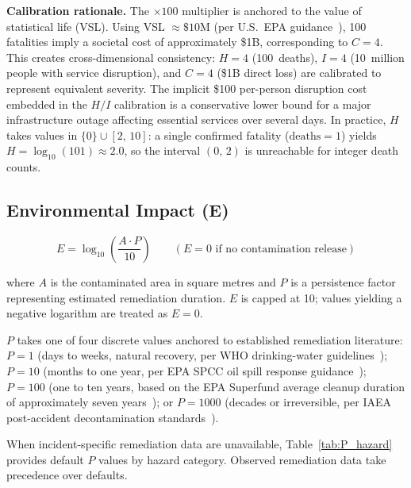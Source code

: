 \documentclass[11pt]{article}
\begin{document}
\textbf{Calibration rationale.}
The $\times 100$ multiplier is anchored to the value of statistical life (VSL).
Using VSL $\approx \$10$M (per U.S.\ EPA guidance~\cite{epa_vsl}),
100 fatalities imply a societal cost of approximately \$1B,
corresponding to $C = 4$.
This creates cross-dimensional consistency:
$H = 4$ (100~deaths), $I = 4$ (10~million people with service disruption),
and $C = 4$ (\$1B direct loss) are calibrated to represent equivalent severity.
The implicit \$100 per-person disruption cost embedded in the $H/I$ calibration
is a conservative lower bound for a major infrastructure outage
affecting essential services over several days.
In practice, $H$ takes values in $\{0\} \cup [2,\, 10]$:
a single confirmed fatality ($\text{deaths} = 1$) yields
$H = \log_{10}(101) \approx 2.0$, so the interval $(0,\, 2)$ is unreachable
for integer death counts.

\subsection{Environmental Impact (E)}

\begin{equation}
  E = \log_{10}\!\left(\frac{A \cdot P}{10}\right)
  \qquad (E = 0 \text{ if no contamination release})
  \label{eq:E}
\end{equation}

where $A$ is the contaminated area in square metres and $P$ is a persistence
factor representing estimated remediation duration.
$E$ is capped at 10; values yielding a negative logarithm are treated as $E = 0$.

$P$ takes one of four discrete values anchored to established remediation
literature: $P = 1$ (days to weeks, natural recovery, per WHO
drinking-water guidelines~\cite{who_water}); $P = 10$ (months to one year,
per EPA SPCC oil spill response guidance~\cite{epa_spcc}); $P = 100$
(one to ten years, based on the EPA Superfund average cleanup duration
of approximately seven years~\cite{epa_cercla}); or $P = 1000$
(decades or irreversible, per IAEA post-accident
decontamination standards~\cite{iaea_decon}).

When incident-specific remediation data are unavailable, Table~\ref{tab:P_hazard}
provides default $P$ values by hazard category.
Observed remediation data take precedence over defaults.
\end{document}
